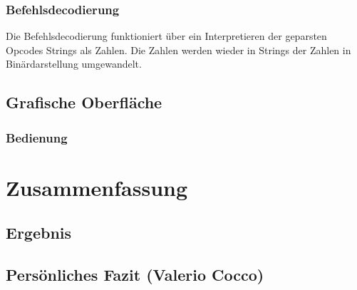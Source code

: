 

\subsubsection{Befehlsdecodierung}
Die Befehlsdecodierung funktioniert über ein Interpretieren der geparsten Opcodes Strings als Zahlen.
Die Zahlen werden wieder in Strings der Zahlen in Binärdarstellung umgewandelt.


\subsection{Grafische Oberfläche}

\subsubsection{Bedienung}



\section{Zusammenfassung}

\subsection{Ergebnis}


\subsection{Persönliches Fazit (Valerio Cocco)}

